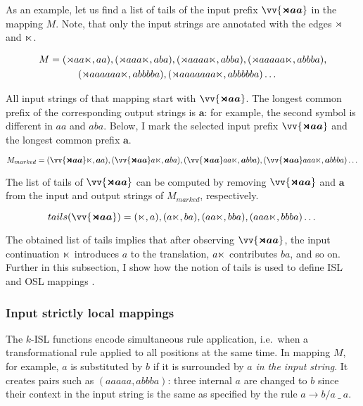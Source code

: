 As an example, let us find a list of tails of the input prefix $\vv{\bm{\bow aa}}$ in the mapping $M$.
Note, that only the input strings are annotated with the edges $\rtimes$ and $\ltimes$.


\begin{multline*}
M = (\bow aa\eow, aa), (\bow aaa\eow, aba), (\bow aaaa\eow, abba), (\bow aaaaa\eow, abbba), \\
 \qquad\quad \shoveleft{(\bow aaaaaa\eow, abbbba), (\bow aaaaaaa\eow, abbbbba)\dots}
\end{multline*}


All input strings of that mapping start with $\vv{\bm{\bow aa}}$.
The longest common prefix of the corresponding output strings is $\bm{a}$: for example, the second symbol is different in $aa$ and $aba$.
Below, I mark the selected input prefix $\vv{\bm{\bow aa}}$ and the longest common prefix $\bm{a}$.


$$
M_{marked} = (\vv{\bm{\bow aa}}\eow, \bm{a}a), (\vv{\bm{\bow aa}}a\eow, \bm{a}ba), (\vv{\bm{\bow aa}}aa\eow, \bm{a}bba), (\vv{\bm{\bow aa}}aaa\eow, \bm{a}bbba) \dots
$$

The list of tails of $\vv{\bm{\bow aa}}$ can be computed by removing $\vv{\bm{\bow aa}}$ and $\bm{a}$ from the input and output strings of $M_{marked}$, respectively.

$$
tails(\vv{\bm{\bow aa}}) = (\eow, a), (a\eow, ba), (aa\eow, bba), (aaa\eow, bbba)\dots
$$

The obtained list of tails implies that after observing $\vv{\bm{\bow aa}}$, the input continuation $\ltimes$ introduces $a$ to the translation,  $a\ltimes$ contributes $ba$, and so on.
Further in this subsection, I show how the notion of tails is used to define ISL and OSL mappings \citep{Chandlee2014,ChandleeEtAl2014,ChandleeEtAl2015}.



\subsubsection{Input strictly local mappings}

The $k$-ISL functions encode simultaneous rule application, i.e.\ when a transformational rule applied to all positions at the same time.
In mapping $M$, for example, $a$ is substituted by $b$ if it is surrounded by $a$ \emph{in the input string}.
It creates pairs such as $(aaaaa, abbba)$: three internal $a$ 
are changed to $b$ since their context in the input string is the same as specified by the rule $a \rightarrow b / a~ \_~ a$.

